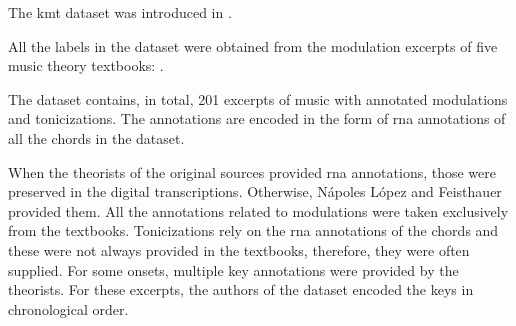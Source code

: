 
The \gls{kmt} dataset was introduced in
\textcite{napoleslopez2020local}.

All the labels in the dataset were obtained from the
modulation excerpts of five music theory textbooks:
\textcite{aldwell2019harmony, kostka2008tonal,
reger1904supplement, rimskikorsakov1886practical,
tchaikovsky1872guide}.

The dataset contains, in total, 201 excerpts of music with
annotated modulations and tonicizations. The annotations are
encoded in the form of \gls{rna} annotations of all the
chords in the dataset. 

When the theorists of the original sources provided
\gls{rna} annotations, those were preserved in the digital
transcriptions. Otherwise, N\'apoles L\'opez and Feisthauer
provided them. All the annotations related to modulations
were taken exclusively from the textbooks. Tonicizations
rely on the \gls{rna} annotations of the chords and these
were not always provided in the textbooks, therefore, they
were often supplied. For some onsets, multiple key
annotations were provided by the theorists. For these
excerpts, the authors of the dataset encoded the keys in
chronological order.
